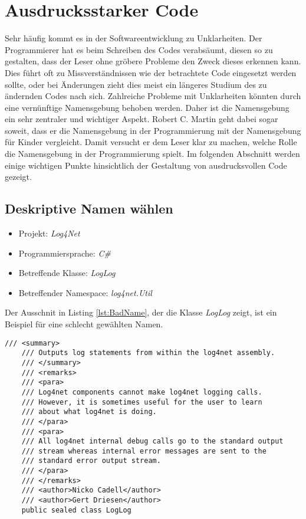 \section{Ausdrucksstarker Code}
Sehr häufig kommt es in der Softwareentwicklung zu Unklarheiten. Der Programmierer hat es beim Schreiben des Codes verabsäumt, diesen so zu gestalten, dass der Leser ohne gröbere Probleme den Zweck dieses erkennen kann. Dies führt oft zu Missverständnissen wie der betrachtete Code eingesetzt werden sollte, oder bei Änderungen zieht dies meist ein längeres Studium des zu ändernden Codes nach sich. Zahlreiche Probleme mit Unklarheiten könnten durch eine vernünftige Namensgebung behoben werden. Daher ist die Namensgebung ein sehr zentraler und wichtiger Aspekt. Robert C. Martin geht dabei sogar soweit, dass er die Namensgebung in der Programmierung mit der Namensgebung für Kinder vergleicht. Damit versucht er dem Leser klar zu machen, welche Rolle die Namensgebung in der Programmierung spielt. Im
folgenden Abschnitt werden einige wichtigen Punkte hinsichtlich der Gestaltung von ausdrucksvollen Code gezeigt.

\subsection{Deskriptive Namen wählen}
\begin{itemize}
	\item Projekt: \textit{Log4Net}
	\item Programmiersprache: \textit{C\#}
	\item Betreffende Klasse: \textit{LogLog}
	\item Betreffender Namespace: \textit{log4net.Util}
\end{itemize}

\SuperPar Der Ausschnit in Listing \ref{lst:BadName}, der die Klasse \textit{LogLog} zeigt, ist ein Beispiel für eine schlecht gewählten Namen.

\begin{lstlisting}[language={[Sharp]C}, caption=Beispiele für schlechte Namensgebung, label=lst:BadName]
/// <summary>
	/// Outputs log statements from within the log4net assembly.
	/// </summary>
	/// <remarks>
	/// <para>
	/// Log4net components cannot make log4net logging calls.
	/// However, it is sometimes useful for the user to learn 
	/// about what log4net is doing.
	/// </para>
	/// <para>
	/// All log4net internal debug calls go to the standard output 
	/// stream whereas internal error messages are sent to the 
	/// standard error output stream.
	/// </para>
	/// </remarks>
	/// <author>Nicko Cadell</author>
	/// <author>Gert Driesen</author>
	public sealed class LogLog
\end{lstlisting}

